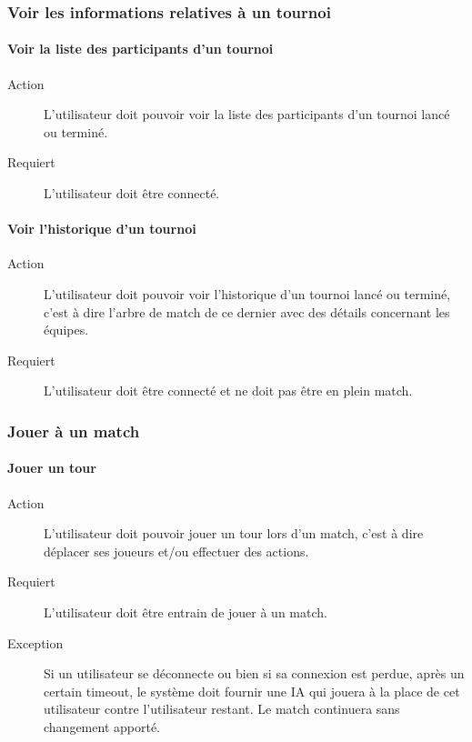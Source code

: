 \documentclass[a4paper]{article}
\begin{document}
\subsubsection{Voir les informations relatives à un tournoi}
\paragraph{Voir la liste des participants d'un tournoi}
\begin{description}
\item[Action] L'\gls{utilisateur} doit pouvoir voir la liste des participants d'un tournoi lancé ou terminé.
\item[Requiert] L'\gls{utilisateur} doit être connecté.
\end{description}
\paragraph{Voir l'historique d'un tournoi}
\begin{description}
\item[Action] L'\gls{utilisateur} doit pouvoir voir l'historique d'un tournoi lancé ou terminé, c'est à dire l'arbre de match de ce dernier avec des détails concernant les équipes.
\item[Requiert] L'\gls{utilisateur} doit être connecté et ne doit pas être en plein match.
\end{description}

\subsubsection{Jouer à un match}
\paragraph{Jouer un tour}
\begin{description}
\item[Action] L'\gls{utilisateur} doit pouvoir jouer un tour lors d'un match, c'est à dire déplacer ses joueurs et/ou effectuer des actions.
\item[Requiert] L'utilisateur doit être entrain de jouer à un match.
\item[Exception] Si un \gls{utilisateur} se déconnecte ou bien si sa connexion est perdue, après un certain timeout, le système doit fournir une IA qui jouera à la place de cet \gls{utilisateur} contre l'\gls{utilisateur} restant. Le match continuera sans changement apporté.
\end{description}
\end{document}
